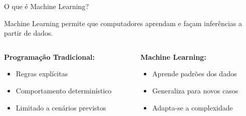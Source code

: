 \documentclass[xcolor=dvipsnames,t,aspectratio=169]{beamer} %
\newcommand{\highlight}[1]{{\color{nes_dark_orange} #1}}
\begin{document}
\begin{frame}[c]{O que é Machine Learning?}
    \begin{center}
        \Large
        \highlight{Machine Learning permite que computadores aprendam e façam inferências a partir de dados.}
    \end{center}
    
    \vspace{1cm}
    
    \begin{columns}[c]
        \begin{column}{0.5\textwidth}
            \textbf{Programação Tradicional:}
            \begin{itemize}
                \item Regras explícitas
                \item Comportamento determinístico
                \item Limitado a cenários previstos
            \end{itemize}
        \end{column}
        \begin{column}{0.5\textwidth}
            \textbf{Machine Learning:}
            \begin{itemize}
                \item Aprende padrões dos dados
                \item Generaliza para novos casos
                \item Adapta-se a complexidade
            \end{itemize}
        \end{column}
    \end{columns}
\end{frame}
\end{document}
